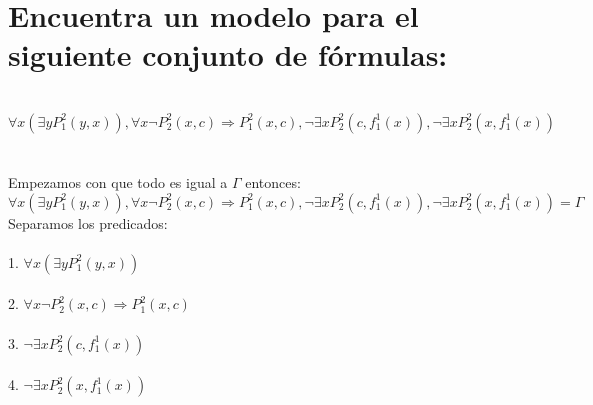 \documentclass{article}
\begin{document}
\section{ Encuentra un modelo para el siguiente conjunto de fórmulas: }
\\
$\forall x(\exists yP^2_1(y,x)),\forall x \neg P^2_2(x,c) \Rightarrow P^2_1(x,c), \neg \exists xP^2_2(c, f^1_1(x)), \neg \exists xP^2_2(x, f^1_1(x))$
\\
\\
\\
Empezamos con que todo es igual a $\Gamma$ entonces: 
\\
$\forall x(\exists yP^2_1(y,x)),\forall x \neg P^2_2(x,c) \Rightarrow P^2_1(x,c), \neg \exists xP^2_2(c, f^1_1(x)), \neg \exists xP^2_2(x, f^1_1(x)) = \Gamma$
\\
Separamos los predicados:\\ \\
1. $\forall x(\exists yP^2_1(y,x))$\\ \\
2. $\forall x \neg P^2_2(x,c) \Rightarrow P^2_1(x,c)$\\ \\
3. $\neg \exists xP^2_2(c, f^1_1(x))$\\ \\
4. $\neg \exists xP^2_2(x, f^1_1(x))$\\
\end{document}
